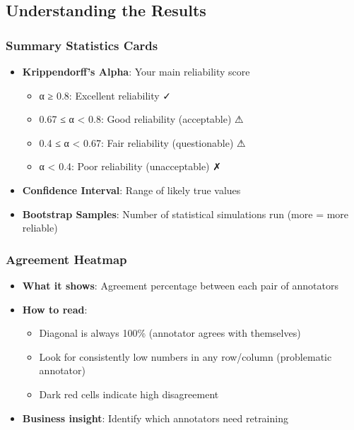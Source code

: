 \documentclass[11pt]{article}
\begin{document}
\subsection{Understanding the Results}

\subsubsection{Summary Statistics Cards}
\begin{itemize}
\item \textbf{Krippendorff's Alpha}: Your main reliability score
\begin{itemize}
\item α ≥ 0.8: Excellent reliability ✓
\item 0.67 ≤ α < 0.8: Good reliability (acceptable) ⚠
\item 0.4 ≤ α < 0.67: Fair reliability (questionable) ⚠
\item α < 0.4: Poor reliability (unacceptable) ✗
\end{itemize}
\item \textbf{Confidence Interval}: Range of likely true values
\item \textbf{Bootstrap Samples}: Number of statistical simulations run (more = more reliable)
\end{itemize}

\subsubsection{Agreement Heatmap}
\begin{itemize}
\item \textbf{What it shows}: Agreement percentage between each pair of annotators
\item \textbf{How to read}: 
\begin{itemize}
\item Diagonal is always 100\% (annotator agrees with themselves)
\item Look for consistently low numbers in any row/column (problematic annotator)
\item Dark red cells indicate high disagreement
\end{itemize}
\item \textbf{Business insight}: Identify which annotators need retraining
\end{itemize}
\end{document}
